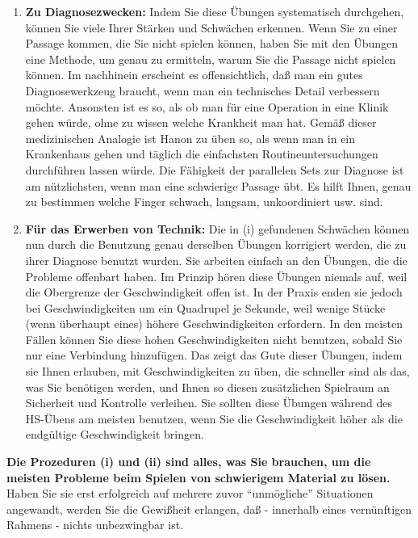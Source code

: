 \begin{enumerate}[label={\roman*.}] 
\item \textbf{Zu Diagnosezwecken:} Indem Sie diese Übungen systematisch durchgehen, können Sie viele Ihrer Stärken und Schwächen erkennen.
Wenn Sie zu einer Passage kommen, die Sie nicht spielen können, haben Sie mit den Übungen eine Methode, um genau zu ermitteln, warum Sie die Passage nicht spielen können.
Im nachhinein erscheint es offensichtlich, daß man ein gutes Diagnosewerkzeug braucht, wenn man ein technisches Detail verbessern möchte.
Ansonsten ist es so, als ob man für eine Operation in eine Klinik gehen würde, ohne zu wissen welche Krankheit man hat.
Gemäß dieser medizinischen Analogie ist Hanon zu üben so, als wenn man in ein Krankenhaus gehen und täglich die einfachsten Routineuntersuchungen durchführen lassen würde.
Die Fähigkeit der parallelen Sets zur Diagnose ist am nützlichsten, wenn man eine schwierige Passage übt.
Es hilft Ihnen, genau zu bestimmen welche Finger schwach, langsam, unkoordiniert usw. sind.


\item \textbf{Für das Erwerben von Technik:} Die in (i) gefundenen Schwächen können nun durch die Benutzung genau derselben Übungen korrigiert werden, die zu ihrer Diagnose benutzt wurden.
Sie arbeiten einfach an den Übungen, die die Probleme offenbart haben.
Im Prinzip hören diese Übungen niemals auf, weil die Obergrenze der Geschwindigkeit offen ist.
In der Praxis enden sie jedoch bei Geschwindigkeiten um ein Quadrupel je Sekunde, weil wenige Stücke (wenn überhaupt eines) höhere Geschwindigkeiten erfordern.
In den meisten Fällen können Sie diese hohen Geschwindigkeiten nicht benutzen, sobald Sie nur eine Verbindung hinzufügen.
Das zeigt das Gute dieser Übungen, indem sie Ihnen erlauben, mit Geschwindigkeiten zu üben, die schneller sind als das, was Sie benötigen werden, und Ihnen so diesen zusätzlichen Spielraum an Sicherheit und Kontrolle verleihen.
Sie sollten diese Übungen während des HS-Übens am meisten benutzen, wenn Sie die Geschwindigkeit höher als die endgültige Geschwindigkeit bringen.


 \end{enumerate}
\textbf{Die Prozeduren (i) und (ii) sind alles, was Sie brauchen, um die meisten Probleme beim Spielen von schwierigem Material zu lösen.}
Haben Sie sie erst erfolgreich auf mehrere zuvor \enquote{unmögliche} Situationen angewandt, werden Sie die Gewißheit erlangen, daß - innerhalb eines vernünftigen Rahmens - nichts unbezwingbar ist.

